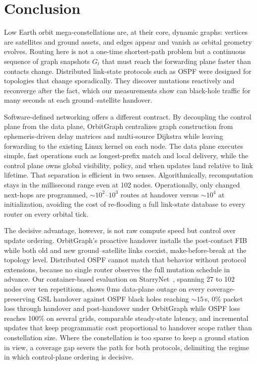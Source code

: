 
\section{Conclusion}
\label{sec:conclusion}

Low Earth orbit mega-constellations are, at their core, dynamic graphs:
vertices are satellites and ground assets, and edges appear and vanish as
orbital geometry evolves. Routing here is not a one-time shortest-path problem
but a continuous sequence of graph snapshots $G_t$ that must reach the
forwarding plane faster than contacts change.
Distributed link-state protocols such as OSPF were designed for topologies that
change sporadically. They discover mutations reactively and reconverge after the
fact, which our measurements show can black-hole traffic for many seconds at
each ground--satellite handover.

Software-defined networking offers a different contract.
By decoupling the control plane from the data plane, OrbitGraph
centralizes graph construction from ephemeris-driven delay
matrices and multi-source Dijkstra while leaving forwarding to the
existing Linux kernel on each node.
The data plane executes simple, fast operations such as longest-prefix match
and local delivery, while the control plane owns global visibility, policy, and
when updates land relative to link lifetime.
That separation is efficient in two senses. Algorithmically, recomputation stays
in the millisecond range even at 102 nodes. Operationally, only changed
next-hops are programmed, ${\sim}10^2$–$10^3$ routes at handover versus
${\sim}10^4$ at initialization, avoiding the cost of re-flooding a full
link-state database to every router on every orbital tick.

The decisive advantage, however, is not raw compute speed but control
over update ordering.
OrbitGraph's proactive handover installs the post-contact FIB while both old and
new ground--satellite links coexist, make-before-break at the topology level.
Distributed OSPF cannot match that behavior without protocol extensions,
because no single router observes the full mutation schedule in advance.
Our container-based evaluation on StarryNet~\cite{lai2023starrynet}, spanning
27 to 102 nodes over ten repetitions, shows 0\,ms data-plane
outage on every coverage-preserving GSL handover against OSPF black holes
reaching ${\sim}15$\,s, 0\% packet loss through handover and post-handover under
OrbitGraph while OSPF loss reaches 100\% on several grids, comparable
steady-state latency, and incremental updates that keep programmatic cost
proportional to handover scope rather than constellation size. Where the
constellation is too sparse to keep a ground station in view, a coverage gap
severs the path for both protocols, delimiting the regime in which control-plane
ordering is decisive.

